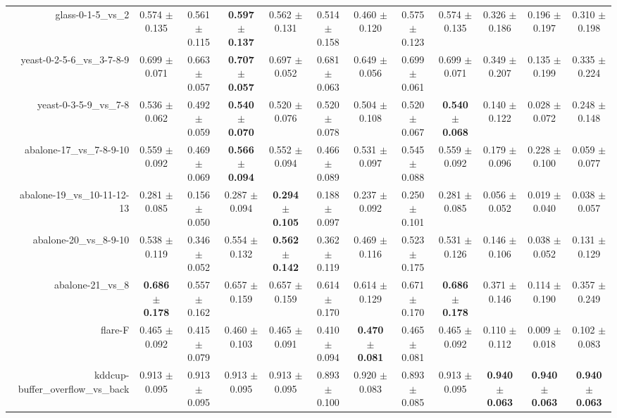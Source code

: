 \begin{table}[!ht]
{\begin{tabular}{r c c c c c c c c c c c}
glass-0-1-5\_vs\_2 & 0.574 $\pm$ 0.135 & 0.561 $\pm$ 0.115 & \textbf{0.597 $\pm$ 0.137} & 0.562 $\pm$ 0.131 & 0.514 $\pm$ 0.158 & 0.460 $\pm$ 0.120 & 0.575 $\pm$ 0.123 & 0.574 $\pm$ 0.135 & 0.326 $\pm$ 0.186 & 0.196 $\pm$ 0.197 & 0.310 $\pm$ 0.198 \\
yeast-0-2-5-6\_vs\_3-7-8-9 & 0.699 $\pm$ 0.071 & 0.663 $\pm$ 0.057 & \textbf{0.707 $\pm$ 0.057} & 0.697 $\pm$ 0.052 & 0.681 $\pm$ 0.063 & 0.649 $\pm$ 0.056 & 0.699 $\pm$ 0.061 & 0.699 $\pm$ 0.071 & 0.349 $\pm$ 0.207 & 0.135 $\pm$ 0.199 & 0.335 $\pm$ 0.224 \\
yeast-0-3-5-9\_vs\_7-8 & 0.536 $\pm$ 0.062 & 0.492 $\pm$ 0.059 & \textbf{0.540 $\pm$ 0.070} & 0.520 $\pm$ 0.076 & 0.520 $\pm$ 0.078 & 0.504 $\pm$ 0.108 & 0.520 $\pm$ 0.067 & \textbf{0.540 $\pm$ 0.068} & 0.140 $\pm$ 0.122 & 0.028 $\pm$ 0.072 & 0.248 $\pm$ 0.148 \\
abalone-17\_vs\_7-8-9-10 & 0.559 $\pm$ 0.092 & 0.469 $\pm$ 0.069 & \textbf{0.566 $\pm$ 0.094} & 0.552 $\pm$ 0.094 & 0.466 $\pm$ 0.089 & 0.531 $\pm$ 0.097 & 0.545 $\pm$ 0.088 & 0.559 $\pm$ 0.092 & 0.179 $\pm$ 0.096 & 0.228 $\pm$ 0.100 & 0.059 $\pm$ 0.077 \\
abalone-19\_vs\_10-11-12-13 & 0.281 $\pm$ 0.085 & 0.156 $\pm$ 0.050 & 0.287 $\pm$ 0.094 & \textbf{0.294 $\pm$ 0.105} & 0.188 $\pm$ 0.097 & 0.237 $\pm$ 0.092 & 0.250 $\pm$ 0.101 & 0.281 $\pm$ 0.085 & 0.056 $\pm$ 0.052 & 0.019 $\pm$ 0.040 & 0.038 $\pm$ 0.057 \\
abalone-20\_vs\_8-9-10 & 0.538 $\pm$ 0.119 & 0.346 $\pm$ 0.052 & 0.554 $\pm$ 0.132 & \textbf{0.562 $\pm$ 0.142} & 0.362 $\pm$ 0.119 & 0.469 $\pm$ 0.116 & 0.523 $\pm$ 0.175 & 0.531 $\pm$ 0.126 & 0.146 $\pm$ 0.106 & 0.038 $\pm$ 0.052 & 0.131 $\pm$ 0.129 \\
abalone-21\_vs\_8 & \textbf{0.686 $\pm$ 0.178} & 0.557 $\pm$ 0.162 & 0.657 $\pm$ 0.159 & 0.657 $\pm$ 0.159 & 0.614 $\pm$ 0.170 & 0.614 $\pm$ 0.129 & 0.671 $\pm$ 0.170 & \textbf{0.686 $\pm$ 0.178} & 0.371 $\pm$ 0.146 & 0.114 $\pm$ 0.190 & 0.357 $\pm$ 0.249 \\
flare-F & 0.465 $\pm$ 0.092 & 0.415 $\pm$ 0.079 & 0.460 $\pm$ 0.103 & 0.465 $\pm$ 0.091 & 0.410 $\pm$ 0.094 & \textbf{0.470 $\pm$ 0.081} & 0.465 $\pm$ 0.081 & 0.465 $\pm$ 0.092 & 0.110 $\pm$ 0.112 & 0.009 $\pm$ 0.018 & 0.102 $\pm$ 0.083 \\
kddcup-buffer\_overflow\_vs\_back & 0.913 $\pm$ 0.095 & 0.913 $\pm$ 0.095 & 0.913 $\pm$ 0.095 & 0.913 $\pm$ 0.095 & 0.893 $\pm$ 0.100 & 0.920 $\pm$ 0.083 & 0.893 $\pm$ 0.085 & 0.913 $\pm$ 0.095 & \textbf{0.940 $\pm$ 0.063} & \textbf{0.940 $\pm$ 0.063} & \textbf{0.940 $\pm$ 0.063} \\

\end{tabular}}
\end{table}
